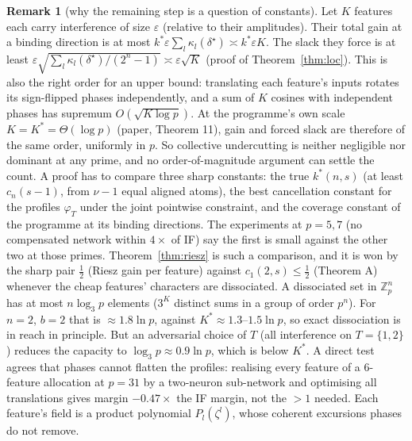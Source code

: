 \documentclass[11pt]{article}
\theoremstyle{definition}
\newtheorem{remark}[theorem]{Remark}
\begin{document}
\begin{remark}[why the remaining step is a question of constants]\label{rem:scaling}
Let $K$ features each carry interference of size $\varepsilon$ (relative to their amplitudes).  Their total gain at a
binding direction is at most $k^*\varepsilon\sum_l\kappa_l(\delta^\star)\asymp k^*\varepsilon K$.  The slack they force is
at least $\varepsilon\sqrt{\sum_l\kappa_l(\delta^\star)/(2^n-1)}\asymp\varepsilon\sqrt K$ (proof of Theorem~\ref{thm:loc}).  This is
also the right order for an upper bound: translating each feature's inputs rotates its sign-flipped phases
independently, and a sum of $K$ cosines with independent phases has supremum $O(\sqrt{K\log p})$.  At the programme's
own scale $K=K^*=\Theta(\log p)$ (paper, Theorem 11), gain and forced slack are therefore of the same order, uniformly in $p$.
So collective undercutting is neither negligible nor dominant at any prime, and no order-of-magnitude argument can
settle the count.  A proof has to compare three sharp constants: the true $k^*(n,s)$ (at least $c_n(s-1)$, from
$\nu-1$ equal aligned atoms), the best cancellation constant for the profiles $\varphi_T$ under the joint pointwise
constraint, and the coverage constant of the programme at its binding directions.  The experiments at $p=5,7$ (no
compensated network within $4\times$ of IF) say the first is small against the other two at those primes.
Theorem~\ref{thm:riesz} is such a comparison, and it is won by the sharp pair $\frac12$ (Riesz gain per feature) against
$c_1(2,s)\le\frac12$ (Theorem A) whenever the cheap features' characters are dissociated.  A dissociated set in $\mathbb Z_p^n$ has
at most $n\log_3p$ elements ($3^K$ distinct sums in a group of order $p^n$).  For $n=2$, $b=2$ that is $\approx1.8\ln p$,
against $K^*\approx1.3$--$1.5\ln p$, so exact dissociation is in reach in principle.  But an adversarial choice of $T$ (all interference on
$T=\{1,2\}$) reduces the capacity to $\log_3p\approx0.9\ln p$, which is below $K^*$.
A direct test agrees that phases cannot flatten the profiles: realising every feature of a $6$-feature allocation at $p=31$ by a
two-neuron sub-network and optimising all translations gives margin $-0.47\times$ the IF margin, not the $>1$ needed.
Each feature's field is a product polynomial $P_l(\zeta^l)$, whose coherent excursions phases do not remove.
\end{remark}
\end{document}
